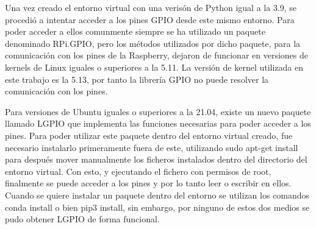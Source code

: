 \documentclass[a4paper, 12pt]{book}
\begin{document}
Una vez creado el entorno virtual con una verisón de Python igual a la 3.9, se procedió a intentar acceder a los pines GPIO desde este mismo entorno. Para poder acceder a ellos comunmente siempre se ha utilizado un paquete denominado RPi.GPIO, pero los métodos utilizados por dicho paquete, para la comunicación con los pines de la Raspberry, dejaron de funcionar en versiones de kernels de Linux iguales o superiores a la 5.11. La versión de kernel utilizada en este trabajo es la 5.13, por tanto la librería GPIO no puede resolver la comunicación con los pines.

Para versiones de Ubuntu iguales o superiores a la 21.04, existe un nuevo paquete llamado LGPIO que implementa las funciones necesarias para poder acceder a los pines. Para poder utilizar este paquete dentro del entorno virtual creado, fue necesario instalarlo primeramente fuera de este, utilizando sudo apt-get install para después mover manualmente los ficheros instalados dentro del directorio del entorno virtual. Con esto, y ejecutando el fichero con permisos de root, finalmente se puede acceder a los pines y por lo tanto leer o escribir en ellos.\\
Cuando se quiere instalar un paquete dentro del entorno se utilizan los comandos conda install o bien pip3 install, sin embargo, por ninguno de estos dos medios se pudo obtener LGPIO de forma funcional.



\printglossary[type=\acronymtype]

\printglossary





\cleardoublepage

%
% 

\raggedright\printbibliography[heading=bibintoc,title={Referencias}]
\end{document}
